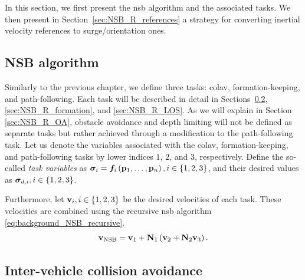 In this section, we first present the \gls{nsb} algorithm and the associated tasks.
We then present in Section~\ref{sec:NSB_R_references} a strategy for converting inertial velocity references to surge/orientation ones.

\subsection{NSB algorithm}
\label{sec:NSB_R_NSB}

Similarly to the previous chapter, we define three tasks: \gls{colav}, formation-keeping, and path-following.
Each task will be described in detail in Sections~\ref{sec:NSB_R_COLAV}, \ref{sec:NSB_R_formation}, and \ref{sec:NSB_R_LOS}.
As we will explain in Section \ref{sec:NSB_R_OA}, obstacle avoidance and depth limiting will not be defined as separate tasks but rather achieved through a modification to the path-following task.
Let us denote the variables associated with the \gls{colav}, formation-keeping, and path-following tasks by lower indices $1$, $2$, and $3$, respectively.
Define the so-called \emph{task variables} as $\bm{\sigma}_i = \bm{f}_i\left(\mathbf{p}_1, \ldots, \mathbf{p}_n\right), i \in \left\{1,2,3\right\}$, and their desired values as $\bm{\sigma}_{d,i}, i \in \left\{1,2,3\right\}$.

Furthermore, let $\mathbf{v}_i, i \in \left\{1,2,3\right\}$ be the desired velocities of each task.    
These velocities are combined using the recursive \gls{nsb} algorithm \eqref{eq:background_NSB_recursive}.
\begin{equation} 
    \mathbf{v}_{\rm NSB} = \mathbf{v}_1 + \mathbf{N}_1\left(\mathbf{v}_2 + \mathbf{N}_2\mathbf{v}_3\right). \label{eq:NSB_R_NSB_with_COLAV}
\end{equation}

\subsection{Inter-vehicle collision avoidance}
\label{sec:NSB_R_COLAV}

